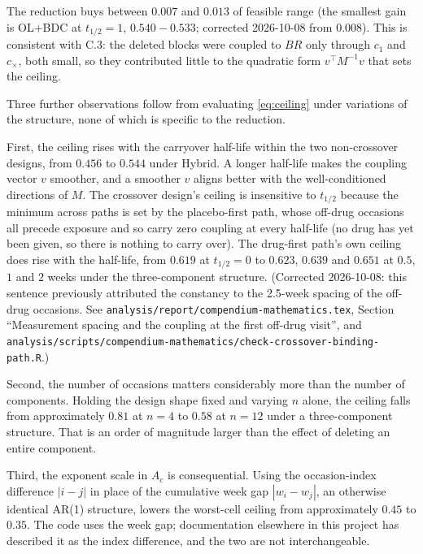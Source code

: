 \documentclass[
  11pt,
]{article}
\newcounter{none} %
\begin{document}
The reduction buys between \(0.007\) and \(0.013\) of feasible range
(the smallest gain is OL+BDC at \(t_{1/2} = 1\), \(0.540 - 0.533\);
corrected 2026-10-08 from \(0.008\)).
This is consistent with C.3: the deleted blocks were coupled to \(BR\)
only through \(c_1\) and \(c_{\times}\), both small, so they contributed
little to the quadratic form \(v^{\top} M^{-1} v\) that sets the
ceiling.

Three further observations follow from evaluating \eqref{eq:ceiling}
under variations of the structure, none of which is specific to the
reduction.

First, the ceiling rises with the carryover half-life within the two
non-crossover designs, from \(0.456\) to \(0.544\) under Hybrid. A longer
half-life makes the coupling vector \(v\) smoother, and a smoother \(v\)
aligns better with the well-conditioned directions of \(M\). The
crossover design's ceiling is insensitive to \(t_{1/2}\) because the
minimum across paths is set by the placebo-first path, whose off-drug
occasions all precede exposure and so carry zero coupling at every
half-life (no drug has yet been given, so there is nothing to carry
over). The drug-first path's own ceiling does rise with the
half-life, from \(0.619\) at \(t_{1/2} = 0\) to \(0.623\), \(0.639\) and
\(0.651\) at \(0.5\), \(1\) and \(2\) weeks under the three-component
structure. (Corrected 2026-10-08: this sentence previously attributed
the constancy to the 2.5-week spacing of the off-drug occasions. See
\texttt{analysis/report/compendium-mathematics.tex}, Section ``Measurement
spacing and the coupling at the first off-drug visit'', and
\texttt{analysis/scripts/compendium-mathematics/check-crossover-binding-path.R}.)

Second, the number of occasions matters considerably more than the
number of components. Holding the design shape fixed and varying \(n\)
alone, the ceiling falls from approximately \(0.81\) at \(n = 4\) to
\(0.58\) at \(n = 12\) under a three-component structure. That is an
order of magnitude larger than the effect of deleting an entire
component.

Third, the exponent scale in \(A_c\) is consequential. Using the
occasion-index difference \(|i-j|\) in place of the cumulative week gap
\(|w_i - w_j|\), an otherwise identical AR(1) structure, lowers the
worst-cell ceiling from approximately \(0.45\) to \(0.35\). The code uses
the week gap; documentation elsewhere in this project has described
it as the index difference, and the two are not interchangeable.
\end{document}
